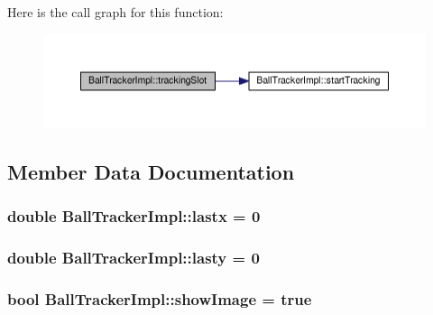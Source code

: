 Here is the call graph for this function\+:\nopagebreak
\begin{figure}[H]
\begin{center}
\leavevmode
\includegraphics[width=350pt]{class_ball_tracker_impl_a4a66db042c2b4a2f0c2f76c6c9fbfa96_cgraph}
\end{center}
\end{figure}




\subsection{Member Data Documentation}
\subsubsection[{\texorpdfstring{lastx}{lastx}}]{\setlength{\rightskip}{0pt plus 5cm}double Ball\+Tracker\+Impl\+::lastx = 0\hspace{0.3cm}{\ttfamily [protected]}}\hypertarget{class_ball_tracker_impl_a9588e1cae36137cab8f815802f9bbf22}{}\label{class_ball_tracker_impl_a9588e1cae36137cab8f815802f9bbf22}
\subsubsection[{\texorpdfstring{lasty}{lasty}}]{\setlength{\rightskip}{0pt plus 5cm}double Ball\+Tracker\+Impl\+::lasty = 0\hspace{0.3cm}{\ttfamily [protected]}}\hypertarget{class_ball_tracker_impl_a350b9d1e03a2191baed4f33c11c7217e}{}\label{class_ball_tracker_impl_a350b9d1e03a2191baed4f33c11c7217e}
\subsubsection[{\texorpdfstring{show\+Image}{showImage}}]{\setlength{\rightskip}{0pt plus 5cm}bool Ball\+Tracker\+Impl\+::show\+Image = true\hspace{0.3cm}{\ttfamily [protected]}}\hypertarget{class_ball_tracker_impl_ad8ac7539ec3de2bb0657048366677bfa}{}\label{class_ball_tracker_impl_ad8ac7539ec3de2bb0657048366677bfa}


